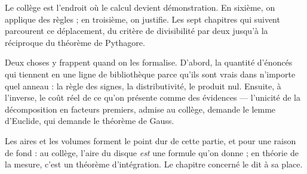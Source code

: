 Le collège est l'endroit où le calcul devient démonstration. En sixième, on applique des
règles ; en troisième, on justifie. Les sept chapitres qui suivent parcourent ce
déplacement, du critère de divisibilité par deux jusqu'à la réciproque du théorème de
Pythagore.

Deux choses y frappent quand on les formalise. D'abord, la quantité d'énoncés qui tiennent
en une ligne de bibliothèque parce qu'ils sont vrais dans n'importe quel anneau : la règle
des signes, la distributivité, le produit nul. Ensuite, à l'inverse, le coût réel de ce
qu'on présente comme des évidences — l'unicité de la décomposition en facteurs premiers,
admise au collège, demande le lemme d'Euclide, qui demande le théorème de Gauss.

Les aires et les volumes forment le point dur de cette partie, et pour une raison de fond :
au collège, l'aire du disque \emph{est} une formule qu'on donne ; en théorie de la mesure,
c'est un théorème d'intégration. Le chapitre concerné le dit à sa place.

